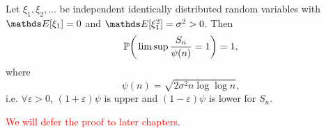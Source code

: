 \begin{theorem}
Let $\xi_1, \xi_2, \dots$ be independent identically distributed random variables with $\E[\xi_1] = 0$ and $\E[\xi_1^2] = \sigma^2 > 0$. Then 
\begin{equation*}
    \mathbb{P} \bigg(\limsup \frac{S_n}{\psi(n)} = 1\bigg) = 1,
\end{equation*}
where 
\begin{equation*}
    \psi(n) = \sqrt{2 \sigma^2 n \log \log n},
\end{equation*}
i.e. $\forall \varepsilon > 0$, $(1 + \varepsilon) \psi$ is upper and $(1 - \varepsilon) \psi$ is lower for $S_n$.
\end{theorem}

\textcolor{red}{We will defer the proof to later chapters.}
\newpage